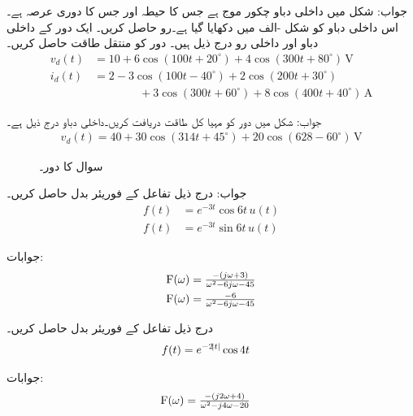 جواب:
شکل  میں داخلی دباو چکور موج ہے جس کا حیطہ  اور جس کا دوری عرصہ  ہے۔اس داخلی دباو کو شکل -الف میں دکھایا گیا ہے۔رو  حاصل کریں۔
ایک دور کے داخلی دباو اور داخلی رو درج ذیل ہیں۔ دور کو منتقل طاقت حاصل کریں۔
\begin{align*}
v_d(t)&=10+6\cos(100t+20^{\circ})+4\cos(300t+80^{\circ})\,\si{\volt}\\
i_d(t)&=2-3\cos(100t-40^{\circ})+2\cos(200t+30^{\circ})\\
&\quad \quad\quad\quad +3\cos(300t+60^{\circ})+8\cos(400t+40^{\circ})\,\si{\ampere}
\end{align*} 

جواب:
شکل  میں دور کو مہیا کل طاقت دریافت کریں۔داخلی دباو درج ذیل ہے۔
\begin{align*}
v_d(t)=40+30\cos(314t+45^{\circ})+20\cos(628-60^{\circ})\,\si{\volt}
\end{align*}
% 
\begin{figure}
\centering
{}
\caption{سوال  کا دور۔}
\label{شکل_سوال_فوریئر_حل_دور_ت}
\end{figure}

جواب:
درج ذیل تفاعل کے فوریئر بدل حاصل کریں۔
\begin{align*}
f(t)&=e^{-3t}\cos 6t \, u(t)\\
f(t)&=e^{-3t}\sin 6t \, u(t)
\end{align*}

جوابات:
\begin{align*}
{\ensuremath{{\textup{F}}}}(\omega)&=\tfrac{-(j\omega +3)}{\omega^2-6j\omega-45}\\
{{\textup{F}}}(\omega)&=\tfrac{-6}{\omega^2-6j\omega-45}
\end{align*}

درج ذیل تفاعل کے فوریئر بدل حاصل کریں۔
\begin{align*}
f(t)&=e^{-2\abs{t}}\cos 4t
\end{align*}

جوابات:
\begin{align*}
{\ensuremath{{\textup{F}}}}(\omega)&=\tfrac{-(j2\omega+4)}{\omega^2-j4\omega-20}
\end{align*}
